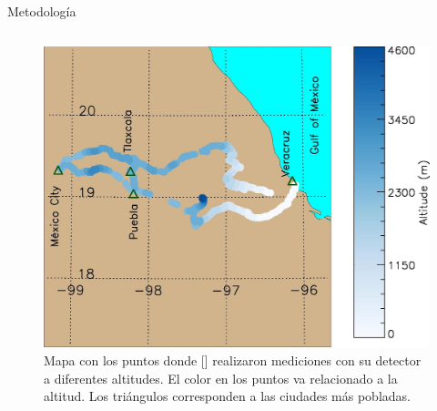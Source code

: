 \begin{frame}{Metodología}
\begin{columns}
            \begin{column}{0.5\textwidth} %
            \begin{figure}
                \includegraphics[width=1.03\textwidth]{Figures/map1.jpg}
                \caption{\tiny Mapa con los puntos donde [\cite{lara2016}] realizaron mediciones con su detector a diferentes altitudes. El color en los puntos va relacionado a la altitud. Los triángulos corresponden a las ciudades más pobladas.}
            \end{figure}
            \end{column}
        \end{columns}
    \end{frame}


